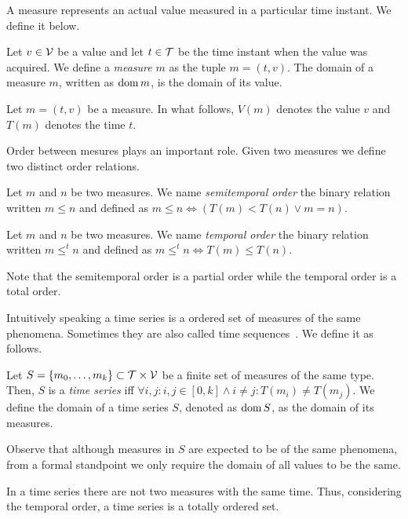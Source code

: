 A measure represents an actual value measured in a particular time
instant. We define it below.

\begin{definition}[Measure]
  Let $v\in\cal{V}$ be a value and let $t\in\cal{T}$ be the time
  instant when the value was acquired. We define a \emph{measure} $m$
  as the tuple $m=(t,v)$. The domain of a measure $m$, written as
  $\operatorname{dom} m$, is the domain of its value.
\end{definition}

Let $m = (t,v)$ be a measure. In what follows, $V(m)$ denotes the
value $v$ and $T(m)$ denotes the time $t$.

Order between mesures plays an important role. Given two measures we
define two distinct order relations.

\begin{definition}
  Let $m$ and $n$ be two measures. We name \emph{semitemporal order}
  the binary relation written $m\leq n$ and defined as $m\leq n\iff
  (T(m)<T(n) \vee m=n)$.
\end{definition}

\begin{definition} Let $m$ and $n$ be two measures. We
    name \emph{temporal order} the binary relation written $m \leq^t
    n$ and defined as $m \leq^t n \iff T(m) \leq T(n)$.
\end{definition}

Note that the semitemporal order is a partial order while the temporal
order is a total order.

Intuitively speaking a time series is a ordered set of measures of the
same phenomena.  Sometimes they are also called time
sequences~\cite{last:hetland}. We define it as follows.

\begin{definition}
  \label{def:model:timeseries}
  Let $S = \{m_0,\ldots,m_k\}\subset\cal{T}\times\cal{V}$ be a finite
  set of measures of the same type. Then, $S$ is a \emph{time series}
  iff $\forall i,j: i,j\in[0,k] \wedge i\neq j: T(m_i)\neq T(m_j)$.
  We define the domain of a time series $S$, denoted as $\operatorname{dom} S$, as
  the domain of its measures.
\end{definition}

Observe that although measures in $S$ are expected to be of the same
phenomena, from a formal standpoint we only require the domain of all
values to be the same. 

In a time series there are not two measures with the same time. Thus,
considering the temporal order, a time series is a totally ordered
set.

